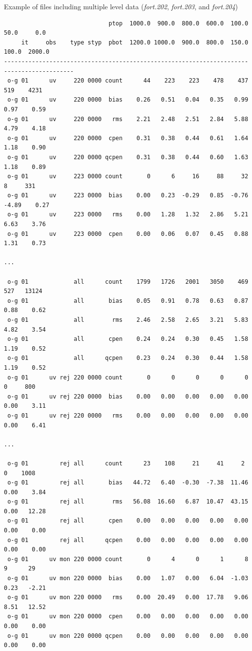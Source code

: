 Example of files including multiple level data (\textit{fort.202}, \textit{fort.203}, and \textit{fort.204})

\begin{scriptsize}
\begin{verbatim}
                              ptop  1000.0  900.0  800.0  600.0  100.0   50.0     0.0
     it     obs    type styp  pbot  1200.0 1000.0  900.0  800.0  150.0  100.0  2000.0
------------------------------------------------------------------------------------------
 o-g 01      uv     220 0000 count      44    223    223    478    437    519    4231
 o-g 01      uv     220 0000  bias    0.26   0.51   0.04   0.35   0.99   0.97    0.59
 o-g 01      uv     220 0000   rms    2.21   2.48   2.51   2.84   5.88   4.79    4.18
 o-g 01      uv     220 0000  cpen    0.31   0.38   0.44   0.61   1.64   1.18    0.90
 o-g 01      uv     220 0000 qcpen    0.31   0.38   0.44   0.60   1.63   1.18    0.89
 o-g 01      uv     223 0000 count       0      6     16     88     32      8     331
 o-g 01      uv     223 0000  bias    0.00   0.23  -0.29   0.85  -0.76  -4.89    0.27
 o-g 01      uv     223 0000   rms    0.00   1.28   1.32   2.86   5.21   6.63    3.76
 o-g 01      uv     223 0000  cpen    0.00   0.06   0.07   0.45   0.88   1.31    0.73

...
 
 o-g 01             all      count    1799   1726   2001   3050    469    527   13124
 o-g 01             all       bias    0.05   0.91   0.78   0.63   0.87   0.88    0.62
 o-g 01             all        rms    2.46   2.58   2.65   3.21   5.83   4.82    3.54
 o-g 01             all       cpen    0.24   0.24   0.30   0.45   1.58   1.19    0.52
 o-g 01             all      qcpen    0.23   0.24   0.30   0.44   1.58   1.19    0.52
 o-g 01      uv rej 220 0000 count       0      0      0      0      0      0     800
 o-g 01      uv rej 220 0000  bias    0.00   0.00   0.00   0.00   0.00   0.00    3.11
 o-g 01      uv rej 220 0000   rms    0.00   0.00   0.00   0.00   0.00   0.00    6.41

...

 o-g 01         rej all      count      23    108     21     41     2      0    1008
 o-g 01         rej all       bias   44.72   6.40  -0.30  -7.38  11.46   0.00    3.84
 o-g 01         rej all        rms   56.08  16.60   6.87  10.47  43.15   0.00   12.28
 o-g 01         rej all       cpen    0.00   0.00   0.00   0.00   0.00   0.00    0.00
 o-g 01         rej all      qcpen    0.00   0.00   0.00   0.00   0.00   0.00    0.00
 o-g 01      uv mon 220 0000 count       0      4      0      1      8      9      29
 o-g 01      uv mon 220 0000  bias    0.00   1.07   0.00   6.04  -1.03   0.23   -2.21
 o-g 01      uv mon 220 0000   rms    0.00  20.49   0.00  17.78   9.06   8.51   12.52
 o-g 01      uv mon 220 0000  cpen    0.00   0.00   0.00   0.00   0.00   0.00    0.00
 o-g 01      uv mon 220 0000 qcpen    0.00   0.00   0.00   0.00   0.00   0.00    0.00


\end{verbatim}
\end{scriptsize}
